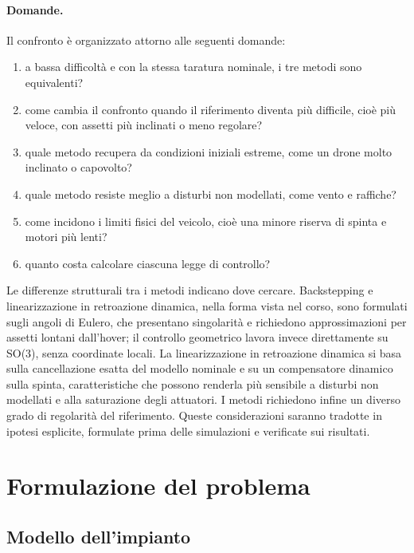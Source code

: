 \documentclass[11pt,a4paper]{article}
\begin{document}
\paragraph{Domande.} Il confronto è organizzato attorno alle seguenti domande:
\begin{enumerate}
  \item a bassa difficoltà e con la stessa taratura nominale, i tre metodi sono equivalenti?
  \item come cambia il confronto quando il riferimento diventa più difficile, cioè più veloce, con assetti più inclinati o meno regolare?
  \item quale metodo recupera da condizioni iniziali estreme, come un drone molto inclinato o capovolto?
  \item quale metodo resiste meglio a disturbi non modellati, come vento e raffiche?
  \item come incidono i limiti fisici del veicolo, cioè una minore riserva di spinta e motori più lenti?
  \item quanto costa calcolare ciascuna legge di controllo?
\end{enumerate}

Le differenze strutturali tra i metodi indicano dove cercare. Backstepping e linearizzazione in retroazione dinamica, nella forma vista nel corso, sono formulati sugli angoli di Eulero, che presentano singolarità e richiedono approssimazioni per assetti lontani dall'hover; il controllo geometrico lavora invece direttamente su SO(3), senza coordinate locali. La linearizzazione in retroazione dinamica si basa sulla cancellazione esatta del modello nominale e su un compensatore dinamico sulla spinta, caratteristiche che possono renderla più sensibile a disturbi non modellati e alla saturazione degli attuatori. I metodi richiedono infine un diverso grado di regolarità del riferimento. Queste considerazioni saranno tradotte in ipotesi esplicite, formulate prima delle simulazioni e verificate sui risultati.

\section{Formulazione del problema}

\subsection{Modello dell'impianto}
\end{document}

